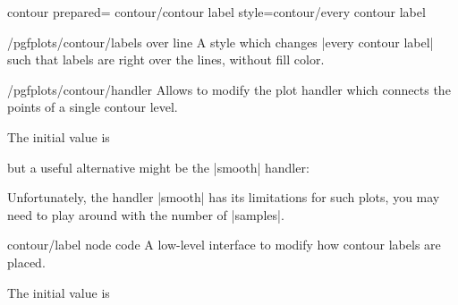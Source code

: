 {{\begin{plottype}[/pgfplots]{contour prepared=\textcolor{black}{}}
\pgfplotsshortstylekey contour/contour label style=contour/every contour label\pgfeov
    \begin{stylekey}{/pgfplots/contour/labels over line}
        A style which changes |every contour label| such that labels are right
        over the lines, without fill color.

\begin{codeexample}[]
\end{codeexample}
    \end{stylekey}

    \begin{stylekey}{/pgfplots/contour/handler}
        Allows to modify the plot handler which connects the points of a single
        contour level.

        The initial value is
\begin{codeexample}
\end{codeexample}
        but a useful alternative might be the |smooth| handler:
\pgfplotsexpensiveexample
\begin{codeexample}[]
\end{codeexample}
        Unfortunately, the \tikzname{} handler |smooth| has its limitations for
        such plots, you may need to play around with the number of |samples|.
    \end{stylekey}

    \begin{pgfplotscodekey}{contour/label node code}
        A low-level interface to modify how contour labels are placed.

        The initial value is
\begin{codeexample}
\end{codeexample}
    \end{pgfplotscodekey}
\end{plottype}

}}
